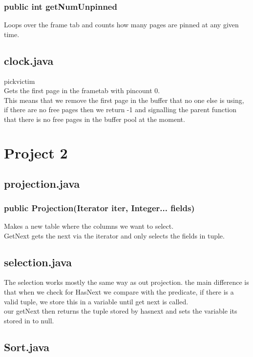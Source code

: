 \documentclass[a4paper,10pt,titlepage]{report}
\begin{document}
\subsubsection{public int getNumUnpinned}

Loops over the frame tab and counts how many pages are pinned at any given time.

\vspace{5mm}
\subsection{clock.java} 
pickvictim \\
Gets the first page in the frametab with pincount 0. \\
This means that we remove the first page in the buffer that no one else is using, if there are no free pages then we return -1 and signalling the parent function that there is no free pages in the buffer pool at the moment.

\newpage
\section{Project 2}

\subsection{projection.java} 
\subsubsection{ public Projection(Iterator iter, Integer... fields) }
Makes a new table where the columns we want to select. \\
	GetNext gets the next via the iterator and only selects the fields in tuple.

\subsection{selection.java}

The selection works mostly the same way as out projection. the main difference is that when we check for HasNext we compare with the predicate, if there is a valid tuple, we store this in a variable until get next is called.
\\
our getNext then returns the tuple stored by hasnext and sets the variable its stored in to null.


\subsection{Sort.java}
\end{document}
